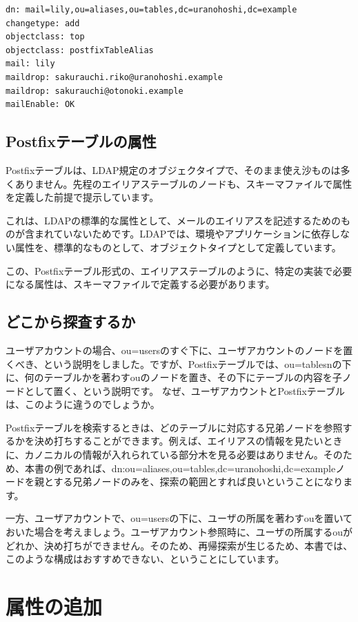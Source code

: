 \begin{verbatim}
dn: mail=lily,ou=aliases,ou=tables,dc=uranohoshi,dc=example
changetype: add
objectclass: top
objectclass: postfixTableAlias
mail: lily
maildrop: sakurauchi.riko@uranohoshi.example
maildrop: sakurauchi@otonoki.example
mailEnable: OK
\end{verbatim}

\subsection{Postfixテーブルの属性}

Postfixテーブルは、LDAP規定のオブジェクタイプで、そのまま使え沙ものは多くありません。先程のエイリアステーブルのノードも、スキーマファイルで属性を定義した前提で提示しています。

これは、LDAPの標準的な属性として、メールのエイリアスを記述するためのものが含まれていないためです。LDAPでは、環境やアプリケーションに依存しない属性を、標準的なものとして、オブジェクトタイプとして定義しています。

この、Postfixテーブル形式の、エイリアステーブルのように、特定の実装で必要になる属性は、スキーマファイルで定義する必要があります。

\subsection{どこから探査するか}

ユーザアカウントの場合、ou=usersのすぐ下に、ユーザアカウントのノードを置くべき、という説明をしました。ですが、Postfixテーブルでは、ou=tablesnの下に、何のテーブルかを著わすouのノードを置き、その下にテーブルの内容を子ノードとして置く、という説明です。
なぜ、ユーザアカウントとPostfixテーブルは、このように違うのでしょうか。

Postfixテーブルを検索するときは、どのテーブルに対応する兄弟ノードを参照するかを決め打ちすることができます。例えば、エイリアスの情報を見たいときに、カノニカルの情報が入れられている部分木を見る必要はありません。そのため、本書の例であれば、dn:ou=aliases,ou=tables,dc=uranohoshi,dc=exampleノードを親とする兄弟ノードのみを、探索の範囲とすれば良いということになります。

一方、ユーザアカウントで、ou=usersの下に、ユーザの所属を著わすouを置いておいた場合を考えましょう。ユーザアカウント参照時に、ユーザの所属するouがどれか、決め打ちができません。そのため、再帰探索が生じるため、本書では、このような構成はおすすめできない、ということにしています。

\section{属性の追加}


